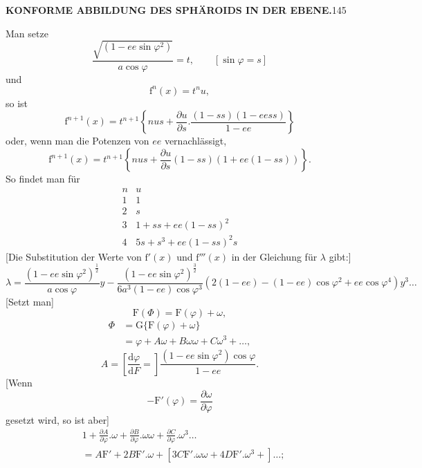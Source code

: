 \par\clearpage
\noindent\null\hfill{\small\textbf{KONFORME ABBILDUNG DES SPHÄROIDS IN DER EBENE.}}\hfill145\par\medskip
Man setze
\[\frac{\sqrt{(1-ee\sin\varphi^2)}}{a\cos\varphi}=t,\qquad[\sin\varphi=s]\]
\noindent und
\[\mathrm f^n(x)=t^nu,\]
\noindent so ist
\[\mathrm f^{n+1}(x)=t^{n+1}\left\{nus+\frac{\partial u}{\partial s}.\frac{(1-ss)(1-eess)}{1-ee}\right\}\]
\noindent oder, wenn man die Potenzen von \(ee\) vernachlässigt,
\[\mathrm f^{n+1}(x)=t^{n+1}\left\{nus+\frac{\partial u}{\partial s}(1-ss)(1+ee(1-ss))\right\}.\]
So findet man für
\[
\begin{array}{c|c}
n&u\\\hline
1&1\\2&s\\3&1+ss+ee(1-ss)^2\\4&5s+s^3+ee(1-ss)^2s
\end{array}
\]
[Die Substitution der Werte von \(\mathrm f'(x)\) und \(\mathrm f'''(x)\) in der Gleichung für \(\lambda\) gibt:]
\[
\lambda=\frac{(1-ee\sin\varphi^2)^{\frac12}}{a\cos\varphi}y-\frac{(1-ee\sin\varphi^2)^{\frac32}}{6a^3(1-ee)\cos\varphi^3}(2(1-ee)-(1-ee)\cos\varphi^2+ee\cos\varphi^4)y^3\ldots
\]
[Setzt man]
\[\mathrm F(\Phi)=\mathrm F(\varphi)+\omega,\]
\[\begin{aligned}\Phi&=\mathrm G\{\mathrm F(\varphi)+\omega\}\\&=\varphi+A\omega+B\omega\omega+C\omega^3+\ldots,\end{aligned}\]
\noindent[wobei]
\[A=\left[\frac{\mathrm d\varphi}{\mathrm dF}=\right]\frac{(1-ee\sin\varphi^2)\cos\varphi}{1-ee}.\]
[Wenn
\[-\mathrm F'(\varphi)=\frac{\partial\omega}{\partial\varphi}\]
\noindent gesetzt wird, so ist aber]
\[
\begin{aligned}
&1+\frac{\partial A}{\partial\varphi}.\omega+\frac{\partial B}{\partial\varphi}.\omega\omega+\frac{\partial C}{\partial\varphi}.\omega^3\ldots\\
&=A\mathrm F'+2B\mathrm F'.\omega+[3C\mathrm F'.\omega\omega+4D\mathrm F'.\omega^3+]\ldots;
\end{aligned}
\]
\par

